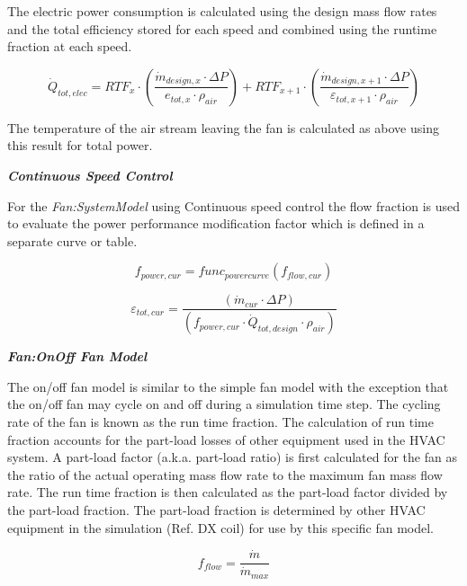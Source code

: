 The electric power consumption is calculated using the design mass flow rates and the total efficiency stored for each speed and combined using the runtime fraction at each speed.

\begin{equation}
{\dot Q_{tot,elec}} = {RTF_{x}} \cdot \left( \frac{\dot m_{design,x}\cdot \Delta P}{{e_{tot,x}}\cdot {\rho_{air}}}\right)  +  {RTF_{x+1}} \cdot \left( \frac{\dot m_{design,x+1}\cdot \Delta P}{{\varepsilon_{tot,x+1}}\cdot {\rho_{air}}}\right)
\end{equation}

The temperature of the air stream leaving the fan is calculated as above using this result for total power. 

\emph{\textbf{Continuous Speed Control}}

For the \emph{Fan:SystemModel} using Continuous speed control the flow fraction is used to evaluate the power performance modification factor which is defined in a separate curve or table.  

\begin{equation}
{f_{power,cur}} =  {func_{power curve}}({f_{flow,cur}})
\end{equation}

\begin{equation}
{\varepsilon_{tot,cur}} = \frac {( { \dot m_{cur} \cdot \Delta P  } )}{( {f_{power,cur}} \cdot { \dot Q_{tot, design} \cdot \rho_{air}})}
\end{equation}

\emph{\textbf{Fan:OnOff Fan Model}}

The on/off fan model is similar to the simple fan model with the exception that the on/off fan may cycle on and off during a simulation time step. The cycling rate of the fan is known as the run time fraction. The calculation of run time fraction accounts for the part-load losses of other equipment used in the HVAC system. A part-load factor (a.k.a. part-load ratio) is first calculated for the fan as the ratio of the actual operating mass flow rate to the maximum fan mass flow rate. The run time fraction is then calculated as the part-load factor divided by the part-load fraction. The part-load fraction is determined by other HVAC equipment in the simulation (Ref. DX coil) for use by this specific fan model.

\begin{equation}
  f_{flow} = \frac{\dot{m}}{\dot{m}_{max}}
\end{equation}

